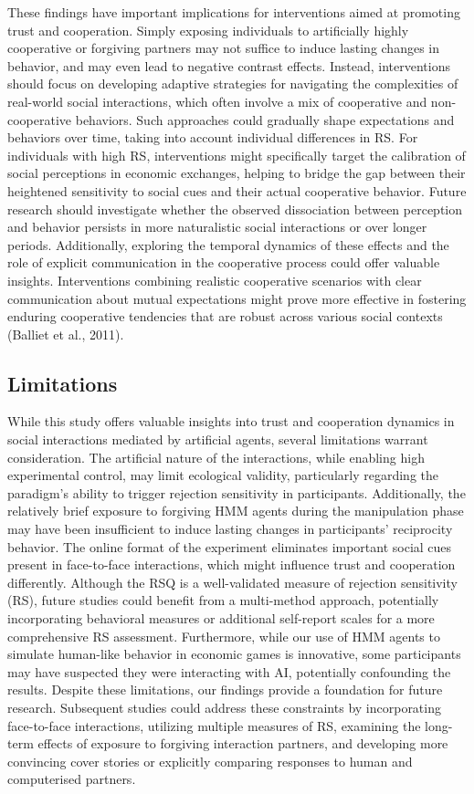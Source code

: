\documentclass[
]{article}
\begin{document}
These findings have important implications for interventions aimed at
promoting trust and cooperation. Simply exposing individuals to
artificially highly cooperative or forgiving partners may not suffice to
induce lasting changes in behavior, and may even lead to negative
contrast effects. Instead, interventions should focus on developing
adaptive strategies for navigating the complexities of real-world social
interactions, which often involve a mix of cooperative and
non-cooperative behaviors. Such approaches could gradually shape
expectations and behaviors over time, taking into account individual
differences in RS. For individuals with high RS, interventions might
specifically target the calibration of social perceptions in economic
exchanges, helping to bridge the gap between their heightened
sensitivity to social cues and their actual cooperative behavior. Future
research should investigate whether the observed dissociation between
perception and behavior persists in more naturalistic social
interactions or over longer periods. Additionally, exploring the
temporal dynamics of these effects and the role of explicit
communication in the cooperative process could offer valuable insights.
Interventions combining realistic cooperative scenarios with clear
communication about mutual expectations might prove more effective in
fostering enduring cooperative tendencies that are robust across various
social contexts (Balliet et al., 2011).

\subsection{Limitations}\label{limitations}

While this study offers valuable insights into trust and cooperation
dynamics in social interactions mediated by artificial agents, several
limitations warrant consideration. The artificial nature of the
interactions, while enabling high experimental control, may limit
ecological validity, particularly regarding the paradigm's ability to
trigger rejection sensitivity in participants. Additionally, the
relatively brief exposure to forgiving HMM agents during the
manipulation phase may have been insufficient to induce lasting changes
in participants' reciprocity behavior. The online format of the
experiment eliminates important social cues present in face-to-face
interactions, which might influence trust and cooperation differently.
Although the RSQ is a well-validated measure of rejection sensitivity
(RS), future studies could benefit from a multi-method approach,
potentially incorporating behavioral measures or additional self-report
scales for a more comprehensive RS assessment. Furthermore, while our
use of HMM agents to simulate human-like behavior in economic games is
innovative, some participants may have suspected they were interacting
with AI, potentially confounding the results. Despite these limitations,
our findings provide a foundation for future research. Subsequent
studies could address these constraints by incorporating face-to-face
interactions, utilizing multiple measures of RS, examining the long-term
effects of exposure to forgiving interaction partners, and developing
more convincing cover stories or explicitly comparing responses to human
and computerised partners.
\end{document}
